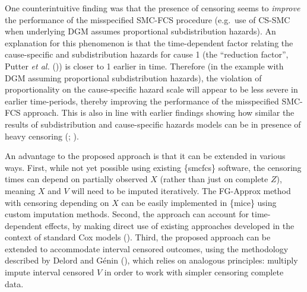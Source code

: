 \documentclass[
  letterpaper,
  paper=240mm:170mm,
  twoside=true,
  open=right,
  fontsize=10pt,
  pagesize=false,
  BCOR=15mm,
  DIV=14,
  headinclude=true,
  footinclude=false,
  headsepline=on]{scrbook}
\begin{document}
One counterintuitive finding was that the presence of censoring seems to
\emph{improve} the performance of the misspecified SMC-FCS procedure
(e.g.~use of CS-SMC when underlying DGM assumes proportional
subdistribution hazards). An explanation for this phenomenon is that the
time-dependent factor relating the cause-specific and subdistribution
hazards for cause 1 (the ``reduction factor'', Putter \emph{et al.}
()) is closer
to 1 earlier in time. Therefore (in the example with DGM assuming
proportional subdistribution hazards), the violation of proportionality
on the cause-specific hazard scale will appear to be less severe in
earlier time-periods, thereby improving the performance of the
misspecified SMC-FCS approach. This is also in line with earlier
findings showing how similar the results of subdistribution and
cause-specific hazards models can be in presence of heavy censoring
(;
).

An advantage to the proposed approach is that it can be extended in
various ways. First, while not yet possible using existing \{smcfcs\}
software, the censoring times can depend on partially observed \(X\)
(rather than just on complete \(Z\)), meaning \(X\) and \(V\) will need
to be imputed iteratively. The FG-Approx method with censoring depending
on \(X\) can be easily implemented in \{mice\} using custom imputation
methods. Second, the approach can account for time-dependent effects, by
making direct use of existing approaches developed in the context of
standard Cox models (). Third, the proposed approach can be extended to
accommodate interval censored outcomes, using the methodology described
by Delord and Génin
(), which
relies on analogous principles: multiply impute interval censored \(V\)
in order to work with simpler censoring complete data.
\end{document}
